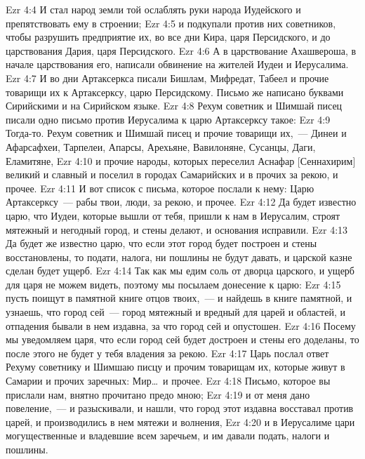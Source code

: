 \vs Ezr 4:4 И стал народ земли той ослаблять руки народа Иудейского и препятствовать ему в строении;
\vs Ezr 4:5 и подкупали против них советников, чтобы разрушить предприятие их, во все дни Кира, царя Персидского, и до царствования Дария, царя Персидского.
\rsbpar\vs Ezr 4:6 А в царствование Ахашвероша, в начале царствования его, написали обвинение на жителей Иудеи и Иерусалима.
\vs Ezr 4:7 И во дни Артаксеркса писали Бишлам, Мифредат, Табеел и прочие товарищи их к Артаксерксу, царю Персидскому. Письмо же написано  буквами Сирийскими и на Сирийском языке.
\vs Ezr 4:8 Рехум советник и Шимшай писец писали одно письмо против Иерусалима к царю Артаксерксу такое:
\vs Ezr 4:9 Тогда-то. Рехум советник и Шимшай писец и прочие товарищи их,~--- Динеи и Афарсафхеи, Тарпелеи, Апарсы, Арехьяне, Вавилоняне, Сусанцы, Даги, Еламитяне,
\vs Ezr 4:10 и прочие народы, которых переселил Аснафар [Сеннахирим] великий и славный и поселил в городах Самарийских и в прочих  за рекою, и прочее.
\vs Ezr 4:11 И вот список с письма, которое послали к нему: Царю Артаксерксу~--- рабы твои, люди,  за рекою, и прочее.
\vs Ezr 4:12 Да будет известно царю, что Иудеи, которые вышли от тебя, пришли к нам в Иерусалим, строят  мятежный и негодный город, и стены делают, и основания  исправили.
\vs Ezr 4:13 Да будет же известно царю, что если этот город будет построен и стены восстановлены, то  подати,  налога, ни пошлины не будут давать, и царской казне сделан будет ущерб.
\vs Ezr 4:14 Так как мы едим соль от дворца царского, и ущерб для царя не можем видеть, поэтому мы посылаем донесение к царю:
\vs Ezr 4:15 пусть поищут в памятной книге отцов твоих,~--- и найдешь в книге памятной, и узнаешь, что город сей~--- город мятежный и вредный для царей и областей, и  отпадения бывали в нем издавна, за что город сей и опустошен.
\vs Ezr 4:16 Посему мы уведомляем царя, что если город сей будет достроен и стены его доделаны, то после этого не будет у тебя владения за рекою.
\rsbpar\vs Ezr 4:17 Царь послал ответ Рехуму советнику и Шимшаю писцу и прочим товарищам их, которые живут в Самарии и  прочих  заречных: Мир\dots\ и прочее.
\vs Ezr 4:18 Письмо, которое вы прислали нам, внятно прочитано предо мною;
\vs Ezr 4:19 и от меня дано повеление,~--- и разыскивали, и нашли, что город этот издавна восставал против царей, и производились в нем мятежи и волнения,
\vs Ezr 4:20 и  в Иерусалиме цари могущественные и владевшие всем заречьем, и им давали подать, налоги и пошлины.
